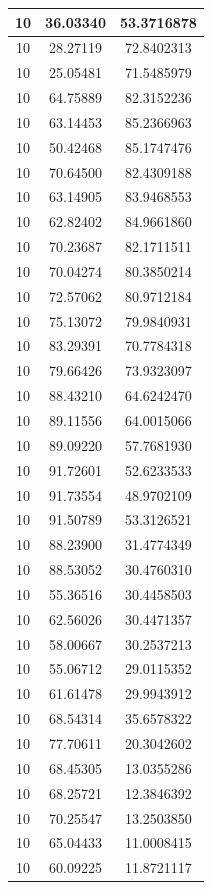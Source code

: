 \documentclass[
]{book}
\begin{document}
\begin{tabular}{c|c|c}
\hline
10 & 36.03340 & 53.3716878\\
\hline
10 & 28.27119 & 72.8402313\\
\hline
10 & 25.05481 & 71.5485979\\
\hline
10 & 64.75889 & 82.3152236\\
\hline
10 & 63.14453 & 85.2366963\\
\hline
10 & 50.42468 & 85.1747476\\
\hline
10 & 70.64500 & 82.4309188\\
\hline
10 & 63.14905 & 83.9468553\\
\hline
10 & 62.82402 & 84.9661860\\
\hline
10 & 70.23687 & 82.1711511\\
\hline
10 & 70.04274 & 80.3850214\\
\hline
10 & 72.57062 & 80.9712184\\
\hline
10 & 75.13072 & 79.9840931\\
\hline
10 & 83.29391 & 70.7784318\\
\hline
10 & 79.66426 & 73.9323097\\
\hline
10 & 88.43210 & 64.6242470\\
\hline
10 & 89.11556 & 64.0015066\\
\hline
10 & 89.09220 & 57.7681930\\
\hline
10 & 91.72601 & 52.6233533\\
\hline
10 & 91.73554 & 48.9702109\\
\hline
10 & 91.50789 & 53.3126521\\
\hline
10 & 88.23900 & 31.4774349\\
\hline
10 & 88.53052 & 30.4760310\\
\hline
10 & 55.36516 & 30.4458503\\
\hline
10 & 62.56026 & 30.4471357\\
\hline
10 & 58.00667 & 30.2537213\\
\hline
10 & 55.06712 & 29.0115352\\
\hline
10 & 61.61478 & 29.9943912\\
\hline
10 & 68.54314 & 35.6578322\\
\hline
10 & 77.70611 & 20.3042602\\
\hline
10 & 68.45305 & 13.0355286\\
\hline
10 & 68.25721 & 12.3846392\\
\hline
10 & 70.25547 & 13.2503850\\
\hline
10 & 65.04433 & 11.0008415\\
\hline
10 & 60.09225 & 11.8721117\\

\end{tabular}
\end{document}
